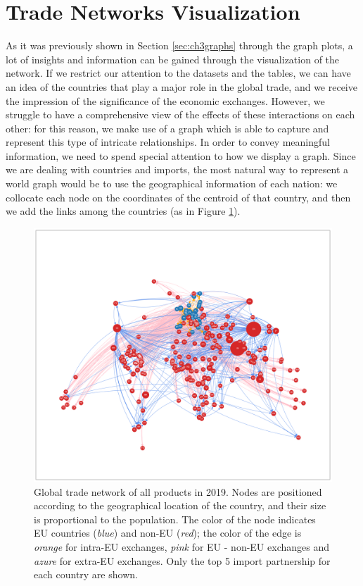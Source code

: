 \section{Trade Networks Visualization}\label{sec:4visualization}

As it was previously shown in Section \ref{sec:ch3graphs} through the graph plots, a lot of insights and information can be gained through the visualization of the network. If we restrict our attention to the datasets and the tables, we can have an idea of the countries that play a major role in the global trade, and we receive the impression of the significance of the economic exchanges. However, we struggle to have a comprehensive view of the effects of these interactions on each other: for this reason, we make use of a graph which is able to capture and represent this type of intricate relationships. In order to convey meaningful information, we need to spend special attention to how we display a graph. Since we are dealing with countries and imports, the most natural way to represent a world graph would be to use the geographical information of each nation: we collocate each node on the coordinates of the centroid of that country, and then we add the links among the countries (as in Figure \ref{fig:geograph}).
\begin{figure}
    \centering
    \includegraphics[width=\textwidth]{pics/full_y19_pTO_geo.png}
    \caption[Global trade network of all products in 2019.]{Global trade network of all products in 2019. Nodes are positioned according to the geographical location of the country, and their size is proportional to the population. The color of the node indicates EU countries (\textit{blue}) and non-EU (\textit{red}); the color of the edge is \textit{orange} for intra-EU exchanges, \textit{pink} for EU - non-EU exchanges and \textit{azure} for extra-EU exchanges. Only the top 5 import partnership for each country are shown.}
    \label{fig:geograph}
\end{figure}
